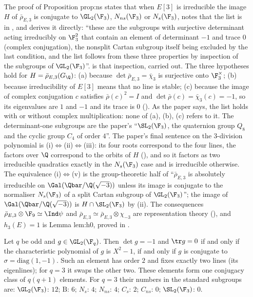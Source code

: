 \begin{paperlink}
The proof of Proposition prop:ns states that when $E[3]$ is irreducible the image $H$ of $\bar\rho_{E,3}$ is conjugate to $\GL_2(\F_3)$, $N_{ns}(\F_3)$ or $N_s(\F_3)$, notes that
the list is in \cite{Zywina15}, and derives it directly: ``these are the subgroups with surjective determinant acting irreducibly on $\F_3^2$ that contain an element of determinant $-1$ and trace
$0$ (complex conjugation), the nonsplit Cartan subgroup itself being excluded by the last condition, and the list follows from these three properties by
inspection of the subgroups of $\GL_2(\F_3)$''.  is that inspection, carried out. The three hypotheses hold for $H=\bar\rho_{E,3}(G_\Q)$:
(a) because $\det\bar\rho_{E,3}=\bar\chi_3$ is surjective onto $\F_3^\times$; (b) because irreducibility of $E[3]$ means that no line is stable; (c) because the image of complex
conjugation $c$ satisfies $\bar\rho(c)^2=I$ and $\det\bar\rho(c)=\bar\chi_3(c)=-1$, so its eigenvalues are $1$ and $-1$ and its trace is $0$ (). As the paper says, the
list holds with or without complex multiplication: none of (a), (b), (c) refers to it. The determinant-one
subgroups are the paper's ``$\SL_2(\F_3)$, the quaternion group $Q_8$ and the cyclic group $C_4$ of order $4$''. The paper's final sentence on the $3$-division polynomial
is (i)$\Leftrightarrow$(ii)$\Leftrightarrow$(iii): its four roots correspond to the four lines, the factors over $\Q$ correspond to the orbits of $H$
(), and so it factors as two irreducible quadratics exactly in the $N_s(\F_3)$ case and is irreducible otherwise. The equivalence (i)$\Leftrightarrow$(v) is the
group-theoretic half of ``$\bar\rho_{E,3}$ is absolutely irreducible on $\Gal(\Qbar/\Q(\sqrt{-3}))$ unless its image is conjugate to the normaliser $N_s(\F_3)$ of a split
Cartan subgroup of $\GL_2(\F_3)$''; the image of
$\Gal(\Qbar/\Q(\sqrt{-3}))$ is $H\cap\SL_2(\F_3)$ by (ii). The consequences $\bar\rho_{E,3}\otimes\F_9\simeq\Ind\psi$ and
$\bar\rho_{E,3}\simeq\bar\rho_{E,3}\otimes\chi_{-3}$ are representation theory (), and $h_3(E)=1$ is Lemma lem:h0, proved in .
\end{paperlink}

\begin{proposition}\label{prop:groups:cc}
Let $q$ be odd and $g\in\GL_2(\F_q)$. Then $\det g=-1$ and $\tr g=0$ if and only if the characteristic polynomial of $g$ is $X^2-1$, if and only if $g$ is conjugate to
$\sigma=\mathrm{diag}(1,-1)$. Such an element has order $2$ and fixes exactly two lines (its eigenlines); for $q=3$ it swaps the other two. These elements form one
conjugacy class of $q(q+1)$ elements. For $q=3$ their numbers in the standard subgroups are: $\GL_2(\F_3)$: $12$; $\mathrm B$: $6$; $N_s$: $4$; $N_{ns}$: $4$; $C_s$: $2$; $C_{ns}$: $0$;
$\SL_2(\F_3)$: $0$.
\end{proposition}

